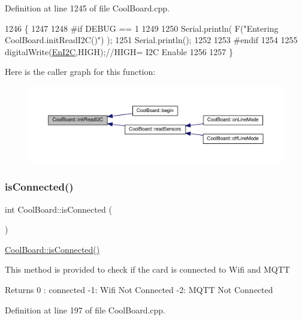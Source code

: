Definition at line 1245 of file Cool\+Board.\+cpp.


\begin{DoxyCode}
1246 \{
1247 
1248 \textcolor{preprocessor}{#if DEBUG == 1}
1249 
1250     Serial.println( F(\textcolor{stringliteral}{"Entering CoolBoard.initReadI2C()"}) );
1251     Serial.println();
1252 
1253 \textcolor{preprocessor}{#endif}
1254  
1255     digitalWrite(\hyperlink{class_cool_board_af1fe1376fc66f93dee80b327ca695377}{EnI2C},HIGH);\textcolor{comment}{//HIGH= I2C Enable}
1256 
1257 \}
\end{DoxyCode}
Here is the caller graph for this function\+:\nopagebreak
\begin{figure}[H]
\begin{center}
\leavevmode
\includegraphics[width=350pt]{d7/df9/class_cool_board_a397b46fadab8f530a8cf4d914c561366_icgraph}
\end{center}
\end{figure}
\mbox{\label{class_cool_board_ad7442cf4b62c7b0d5bd62a0f75ffc065}} 
\subsubsection{\texorpdfstring{is\+Connected()}{isConnected()}}
{\footnotesize\ttfamily int Cool\+Board\+::is\+Connected (\begin{DoxyParamCaption}{ }\end{DoxyParamCaption})}

\hyperlink{class_cool_board_ad7442cf4b62c7b0d5bd62a0f75ffc065}{Cool\+Board\+::is\+Connected()}

This method is provided to check if the card is connected to Wifi and M\+Q\+TT

\begin{DoxyReturn}{Returns}
0 \+: connected -\/1\+: Wifi Not Connected -\/2\+: M\+Q\+TT Not Connected 
\end{DoxyReturn}


Definition at line 197 of file Cool\+Board.\+cpp.


